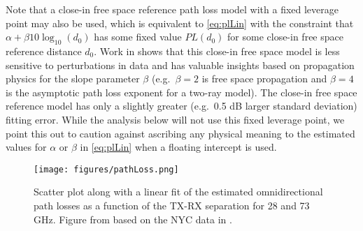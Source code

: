\documentclass[journal]{IEEEtran}
\begin{document}
Note that a close-in free space reference path loss model with a fixed leverage
point may also be used, which is  equivalent to \eqref{eq:plLin}
with the constraint that $\alpha + \beta 10\log_{10}(d_0)$ has some fixed value $PL(d_0)$
for some close-in free space reference distance $d_0$.
Work in \cite{Rappaport-72GHz:13} shows that this close-in free space model
is less sensitive to perturbations in data and has valuable insights based on
propagation physics for the slope parameter $\beta$ (e.g.\ $\beta=2$ is free space
propagation and $\beta=4$ is the asymptotic path loss exponent for a
two-ray model).  The close-in free space reference model has only a slightly greater
(e.g.\ 0.5 dB larger standard deviation) fitting error.  While
the analysis below will not use this
fixed leverage point, we point this out to caution against
ascribing any physical meaning to the estimated values for $\alpha$ or
$\beta$ in \eqref{eq:plLin} when a floating intercept is used.

\begin{figure}
    \centering
    \texttt{[image: figures/pathLoss.png]}
    \caption{Scatter plot along with a linear fit of the estimated omnidirectional
     path losses as a function of the TX-RX separation for 28 and 73 GHz.
     Figure from \cite{AkLiuRanRapEr:13-arxiv} based on the NYC data in
     \cite{rappaportmillimeter}.}
    \label{fig:distPL}
\end{figure}
\end{document}
